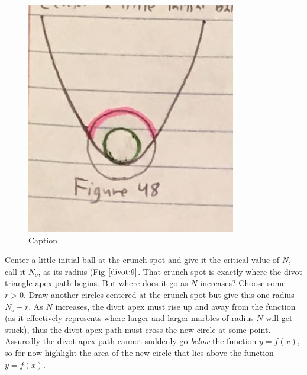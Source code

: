 \renewcommand\w{0.25\textwidth}
\renewcommand\fw{0.9\linewidth}

\begin{figure}
  \label{divot:9}
  \includegraphics[width=\fw]{img/12-divot/09.png}
  \caption{Caption}
\end{figure}

Center a little initial ball at the crunch spot and give it the critical value of $N$, call it $N_o$, as its radius (Fig $\ref{divot:9}$. That crunch spot is exactly where the divot triangle apex path begins. But where does it go as $N$ increases? Choose some $r > 0$. Draw another circles centered at the crunch spot but give this one radius $N_o + r$. As $N$ increases, the divot apex must rise up and away from the function (as it effectively represents where larger and larger marbles of radius $N$ will get stuck), thus the divot apex path must cross the new circle at some point. Assuredly the divot apex path cannot suddenly go \textit{below} the function $y = f(x)$, so for now highlight the area of the new circle that lies above the function $y = f(x)$.

\renewcommand\w{0.25\textwidth}
\renewcommand\fw{0.9\linewidth}


